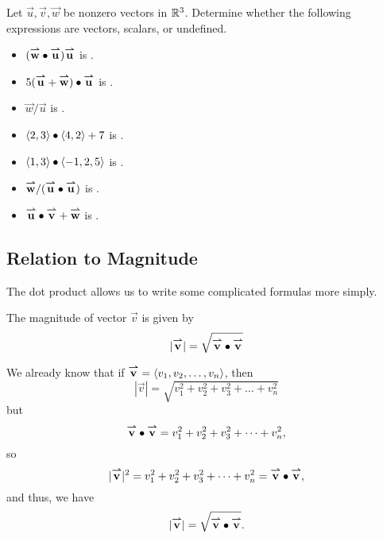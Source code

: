 \documentclass{ximera}
\begin{document}
\begin{question}
  Let $\vec{u},\vec{v},\vec{w}$ be nonzero vectors in $\R^3$.  Determine whether the following expressions are vectors, scalars, or undefined.
  
\begin{itemize} 
\item $(\vec{w} \dotp \vec{u} ) \vec{u}$ is .
\item $5(\vec{u} +\vec{w}) \dotp {\vec{u}}$ is .
\item $\vec{w} / \vec{u}$ is .
\item $\vector{2,3} \dotp \vector{4,2} + 7$ is .
\item $\vector{1,3} \dotp \vector{-1,2,5}$ is .
\item $\vec{w} / ( \vec{u} \dotp \vec{u})$ is .
\item $\vec{u}\dotp \vec{v}+\vec{w}$ is .
\end{itemize}
\end{question}
 
\subsection{Relation to Magnitude} 
The dot product allows us to write some complicated formulas more simply.

\begin{theorem}
  The magnitude of vector $\vec{v}$ is given by
  \[
  |\vec{v}|=\sqrt{\vec{v}\dotp\vec{v}}
  \]
  \begin{explanation}
    We already know that if $\vec{v} = \vector{v_1,v_2,\dots,v_n}$,
    then
    \[
    |\vec{v}| = \sqrt{v_1^2+v_2^2+v_3^2+\dots+v_n^2}
    \]
    but
    \[
    \vec{v} \dotp \vec{v} = v_1^2+v_2^2+v_3^2+\dots+v_n^2,
    \]
    so
    \[
    |\vec{v}|^2= v_1^2+v_2^2+v_3^2+\dots+v_n^2 = \vec{v}\dotp\vec{v},
    \]
    and thus, we have 
      \[
  |\vec{v}|=\sqrt{\vec{v}\dotp\vec{v}}.
  \]
  \end{explanation}
\end{theorem}
\end{document}
